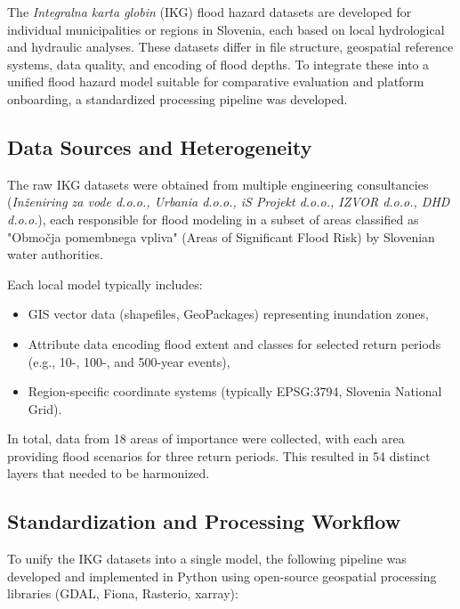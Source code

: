 The \textit{Integralna karta globin} (IKG) flood hazard datasets are developed for individual municipalities or regions in Slovenia, each based on local hydrological and hydraulic analyses. These datasets differ in file structure, geospatial reference systems, data quality, and encoding of flood depths. To integrate these into a unified flood hazard model suitable for comparative evaluation and platform onboarding, a standardized processing pipeline was developed.

\subsection{Data Sources and Heterogeneity}

The raw IKG datasets were obtained from multiple engineering consultancies (\textit{Inženiring za vode d.o.o., Urbania d.o.o., iS Projekt d.o.o., IZVOR d.o.o., DHD d.o.o.}), each responsible for flood modeling in a subset of areas classified as "Območja pomembnega vpliva" (Areas of Significant Flood Risk) by Slovenian water authorities.

Each local model typically includes:
\begin{itemize}
    \item GIS vector data (shapefiles, GeoPackages) representing inundation zones,
    \item Attribute data encoding flood extent and classes for selected return periods (e.g., 10-, 100-, and 500-year events),
    \item Region-specific coordinate systems (typically EPSG:3794, Slovenia National Grid).
\end{itemize}

In total, data from 18 areas of importance were collected, with each area providing flood scenarios for three return periods. This resulted in 54 distinct layers that needed to be harmonized.

\subsection{Standardization and Processing Workflow}

To unify the IKG datasets into a single model, the following pipeline was developed and implemented in Python using open-source geospatial processing libraries (GDAL, Fiona, Rasterio, xarray):

